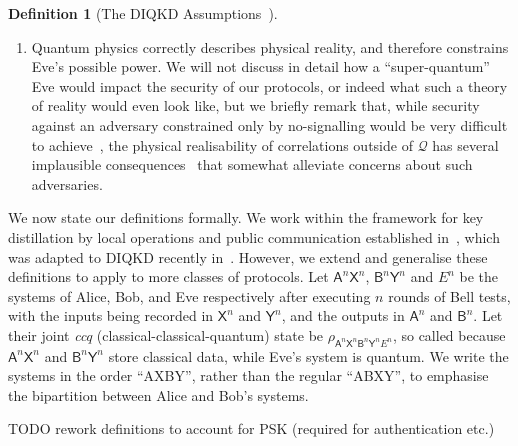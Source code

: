\documentclass[10pt, a4paper]{article}
\numberwithin{equation}{section} %
\newcounter{stmt} %
\theoremstyle{definition}
\newtheorem{defn}[stmt]{Definition}
\theoremstyle{plain}
\newcommand{\?}{\mathrel{?}} %
\newcommand{\crv}[1]{\mathsf{#1}}
\newcommand{\Qs}{\mathcal{Q}}
\begin{document}
\begin{defn}[{The DIQKD Assumptions~\cite{DI_Proofs}}]
\begin{enumerate}
        \item Quantum physics correctly describes physical reality, and therefore constrains Eve's possible power. We will not discuss in detail how a ``super-quantum'' Eve would impact the security of our protocols, or indeed what such a theory of reality would even look like, but we briefly remark that, while security against an adversary constrained only by no-signalling would be very difficult to achieve~\cite{NSMemory, NSPAImpossible, ConsecutiveCKD}, the physical realisability of correlations outside of \(\Qs\) has several implausible consequences~\cite{ImplausibleConseq} that somewhat alleviate concerns about such adversaries.\label{assum:qcorrect}
      \end{enumerate}
    \end{defn}

    We now state our definitions formally. We work within the framework for key distillation by local operations and public communication established in~\cite{CQKeyDistill}, which was adapted to DIQKD recently in~\cite{DIQKD_Limits}. However, we extend and generalise these definitions to apply to more classes of protocols. Let \(\crv{A}^{n}\crv{X}^{n}\), \(\crv{B}^{n}\crv{Y}^{n}\) and \(E^n\) be the systems of Alice, Bob, and Eve respectively after executing \(n\) rounds of Bell tests, with the inputs being recorded in \(\crv{X}^{n}\) and \(\crv{Y}^{n}\), and the outputs in \(\crv{A}^{n}\) and \(\crv{B}^{n}\). Let their joint \emph{ccq} (classical-classical-quantum) state be \(\rho_{\crv{A}^n\crv{X}^n \crv{B}^n\crv{Y}^n E^n}\), so called because \(\crv{A}^n\crv{X}^n\) and \(\crv{B}^n\crv{Y}^n\) store classical data, while Eve's system is quantum. We write the systems in the order ``AXBY'', rather than the regular ``ABXY'', to emphasise the bipartition between Alice and Bob's systems.

    TODO rework definitions to account for PSK (required for authentication etc.)
\end{document}
